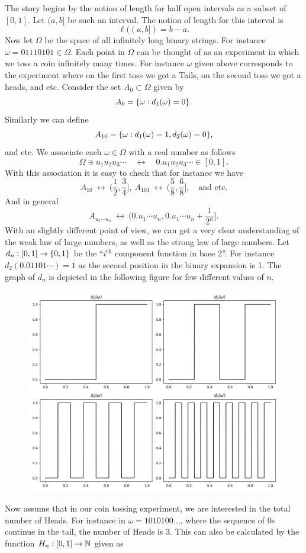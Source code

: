 The story begins by the notion of length for half open intervals as a subset of $ [0,1] $. Let $ (a,b] $ be such an interval. The notion of length for this interval is 
\[ \ell((a,b]) = b-a.\]
Now let $ \Omega $ be the space of all infinitely long binary strings. For instance $ \omega = 01110101 \in \Omega $. Each point in $ \Omega $ can be thought of as an experiment in which we toss a coin infinitely many times. For instance $ \omega $ given above corresponds to the experiment where on the first toss we got a Tails, on the second toss we got a heads, and etc. Consider the set $ A_0 \subset \Omega $ given by
\[ A_0 = \{\omega: d_1(\omega ) = 0\}.  \]
Similarly we can define 
\[ A_{10} = \{\omega: d_1(\omega)=1, d_2(\omega)=0\}, \]
and etc. We associate each $ \omega\in\Omega $ with a real number as follows
\[ \Omega \ni u_1u_2u_3\cdots \quad \longleftrightarrow \quad 0.u_1u_2u_3\cdots \in [0,1]. \tag{\halfnote} \]
With this association it is easy to check that for instance we have
\[ A_{10} \ \longleftrightarrow \ (\frac{1}{2},\frac{3}{4}], \ A_{101} \ \longleftrightarrow\ (\frac{5}{8},\frac{6}{8}],\quad  \text{and etc.} \]
And in general
\[ A_{u_1\cdots u_n} \ \longleftrightarrow\ (0.u_1\cdots u_n, 0.u_1\cdots u_n + \frac{1}{2^n}]. \]
With an slightly different point of view, we can get a very clear understanding of the weak law of large numbers, as well as the strong law of large numbers. Let $ d_n:[0,1] \to \{0,1\} $ be the ``$ i^\text{th} $ component function in base 2''. For instance $ d_2(0.01101\cdots) = 1 $ as the second position in the binary expansion is 1. The graph of $ d_n $ is depicted in the following figure for few different values of $ n $.
\begin{figure}[h!]
	\centering
	\includegraphics[width=0.5\linewidth]{Images/components}
	\label{fig:components}
\end{figure}
\FloatBarrier
Now assume that in our coin tossing experiment, we are interested in the total number of Heads. For instance in $ \omega = 1010100\dots $, where the sequence of 0s continue in the tail, the number of Heads is 3. This can also be calculated by the function $ H_n:[0,1]\to\mathbb{N} $ given as

